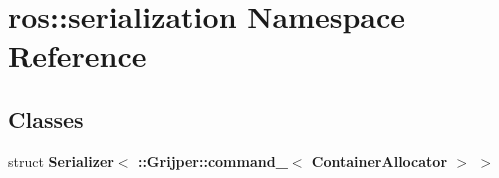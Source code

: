 \section{ros\-:\-:serialization Namespace Reference}
\label{namespaceros_1_1serialization}
\subsection*{Classes}
\begin{DoxyCompactItemize}
\item 
struct {\bf Serializer$<$ \-::\-Grijper\-::command\-\_\-$<$ Container\-Allocator $>$ $>$}
\end{DoxyCompactItemize}
